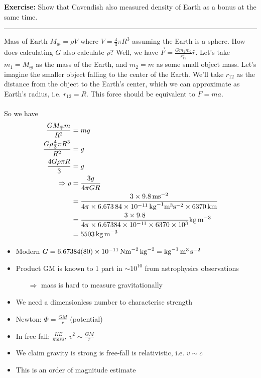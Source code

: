 \documentclass[a4paper]{article} %
\newcommand{\exercise}[2]
{
\begin{framed}
\textbf{Exercise:} #1 \\\hrule
#2
\end{framed}
}
\begin{document}
\exercise{Show that Cavendish also measured density of Earth as a bonus at the same time.}
{Mass of Earth $M_{\oplus}= \rho V$ where $V=\frac{4}{3}\pi R^3$ assuming the Earth is a sphere. How does calculating $G$ also calculate $\rho$? Well, we have $\vec{F}=\frac{Gm_1 m_2}{r_{12}^2}\hat{r}$. Let's take $m_1 = M_\oplus$ as the mass of the Earth, and $m_2 = m$ as some small object mass. Let's imagine the smaller object falling to the center of the Earth. We'll take $r_{12}$ as the distance from the object to the Earth's center, which we can approximate as Earth's radius, i.e. $r_{12}=R$. This force should be equivalent to $F=ma$.\\
\\
So we have
\begin{align*}
\frac{GM_\oplus m}{R^2}&=mg\\
\frac{G\rho \frac{4}{3}\pi R^3}{R^2}&=g\\
\frac{4G \rho \pi R}{3}&=g\\
\Rightarrow \rho &=\frac{3g}{4\pi GR}\\
&=\frac{3\times \SI{9.8}{ms^{-2}}}{4\pi\times \SI{6.67384d-11}{\kg^{-1}\m^3 \s^{-2}}\times \SI{6370}{km}}\\
&=\frac{3\times 9.8}{4\pi\times 6.67384\times 10^{-11}\times 6370\times 10^3}\si{\kg.m^{-3}}\\
&=\SI{5503}{kg.m^{-3}}
\end{align*}
}


\begin{itemize}
\item Modern $G=6.67384(80)\times \SI{d-11}{Nm^{-2}.\kg^{-2}}=\si{\kg^{-1}.\m^3.\s^{-2}}$
\item Product GM is known to 1 part in $\sim 10^{10}$ from astrophysics observations
\begin{itemize}
\item[$\Rightarrow$] mass is hard to measure gravitationally
\end{itemize}
\item We need a dimensionless number to characterise strength
\item Newton: $\Phi=\frac{GM}{r}$ (potential)
\item In free fall: $\frac{KE}{mass}$, $v^2 \sim \frac{GM}{r}$
\item We claim gravity is strong is free-fall is relativistic, i.e. $v\sim c$
\item This is an order of magnitude estimate
\end{itemize}
\end{document}
